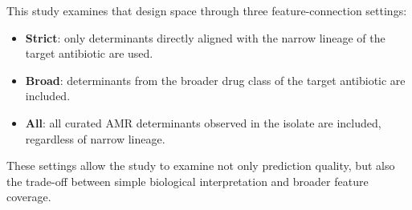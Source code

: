 This study examines that design space through three feature-connection settings:

\begin{itemize}
    \item \textbf{Strict}: only determinants directly aligned with the narrow lineage of the target antibiotic are used.
    \item \textbf{Broad}: determinants from the broader drug class of the target antibiotic are included.
    \item \textbf{All}: all curated AMR determinants observed in the isolate are included, regardless of narrow lineage.
\end{itemize}

These settings allow the study to examine not only prediction quality, but also the trade-off between simple biological interpretation and broader feature coverage.
